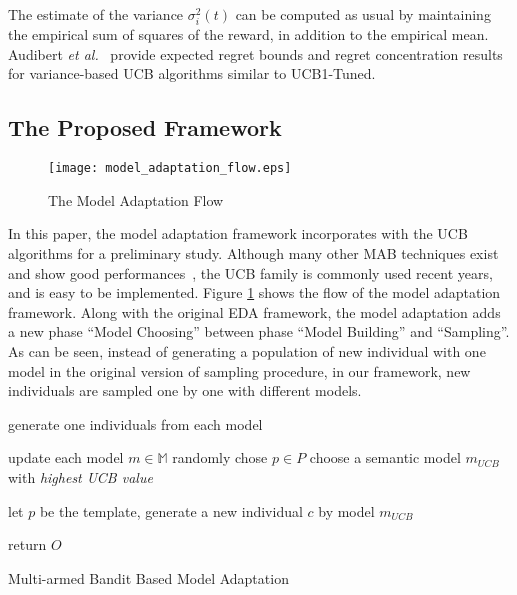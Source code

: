The estimate of the variance $\sigma_i^2(t)$ can be computed as usual by maintaining the empirical sum of squares of the reward, in addition to the empirical mean. Audibert \textit{et al.}~\citep{audibert2009exploration} provide expected regret bounds and regret concentration results for variance-based UCB algorithms similar to UCB1-Tuned.



\subsection{The Proposed Framework}
\begin{figure}[t]
    \texttt{[image: model\_adaptation\_flow.eps]}
    \caption{The Model Adaptation Flow}
    \label{fig:model_adaptation_flow}
\end{figure}
In this paper, the model adaptation framework incorporates with the UCB algorithms for a preliminary study. Although many other MAB techniques exist and show good performances~\citep{Kuleshov2000}, the UCB family is commonly used recent years, and is easy to be implemented. Figure \ref{fig:model_adaptation_flow} shows the flow of the model adaptation framework. Along with the original EDA framework, the model adaptation adds a new phase ``Model Choosing'' between phase ``Model Building'' and ``Sampling''. As can be seen, instead of generating a population of new individual with one model in the original version of sampling procedure, in our framework, new individuals are sampled one by one with different models. 
{\LinesNumbered
\begin{algorithm}[htbp]

        generate one individuals from each model\;
        
            update each model $m \in \mathbb{M}$\;
                randomly chose $p \in P$\;
                choose a semantic model $m_{UCB}$ with \textit{highest UCB value}\;
                
                let $p$ be the template, generate a new individual $c$ by model $m_{UCB}$\;
                
   
        return $O$\;
    \caption{Multi-armed Bandit Based Model Adaptation}
    \label{alg:model_adaptation}
\end{algorithm}}


